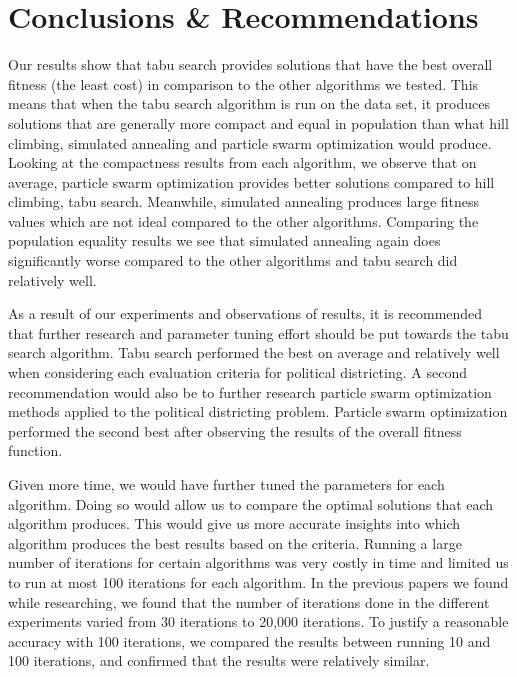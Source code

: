 \documentclass[journal]{IEEEtran}
\begin{document}
\section{Conclusions \& Recommendations}
Our results show that tabu search provides solutions that have the best overall fitness (the least cost) in comparison to the other algorithms we tested. This means that when the tabu search algorithm is run on the data set, it produces solutions that are generally more compact and equal in population than what hill climbing, simulated annealing and particle swarm optimization would produce. Looking at the compactness results from each algorithm, we observe that on average, particle swarm optimization provides better solutions compared to hill climbing, tabu search. Meanwhile, simulated annealing produces large fitness values which are not ideal compared to the other algorithms. Comparing the population equality results we see that simulated annealing again does significantly worse compared to the other algorithms and tabu search did relatively well.

As a result of our experiments and observations of results, it is recommended that further research and parameter tuning effort should be put towards the tabu search algorithm. Tabu search performed the best on average and relatively well when considering each evaluation criteria for political districting. A second recommendation would also be to further research particle swarm optimization methods applied to the political districting problem. Particle swarm optimization performed the second best after observing the results of the overall fitness function.

Given more time, we would have further tuned the parameters for each algorithm. Doing so would allow us to compare the optimal solutions that each algorithm produces. This would give us more accurate insights into which algorithm produces the best results based on the criteria. Running a large number of iterations for certain algorithms was very costly in time and limited us to run at most 100 iterations for each algorithm. In the previous papers we found while researching, we found that the number of iterations done in the different experiments varied from 30 iterations\cite{local-search-2} to 20,000 iterations\cite{geometric-ga}. To justify a reasonable accuracy with 100 iterations, we compared the results between running 10 and 100 iterations, and confirmed that the results were relatively similar.
\end{document}
